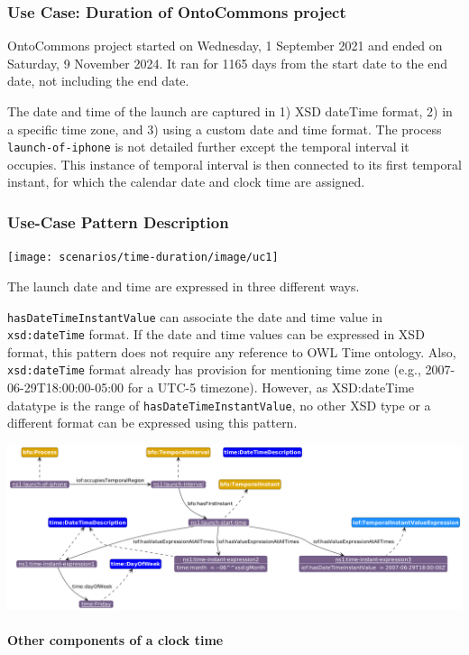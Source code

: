 \subsubsection*{Use Case: Duration of OntoCommons project} 
OntoCommons project started on Wednesday, 1 September 2021 and ended on Saturday, 9 November 2024. It ran for 1165 days from the start date to the end date, not including the end date.

The date and time of the launch are captured in 1) XSD dateTime format, 2) in a specific time zone, and 3) using a custom date and time format. The process \texttt{launch-of-iphone} is not detailed further except the temporal interval it occupies. This instance of temporal interval is then connected to its first temporal instant, for which the calendar date and clock time are assigned.   

\subsubsection*{Use-Case Pattern Description}

\texttt{[image: scenarios/time-duration/image/uc1]}

The launch date and time are expressed in three different ways.  

\texttt{hasDateTimeInstantValue} can associate the date and time value in \texttt{xsd:dateTime} format. If the date and time values can be expressed in XSD format, this pattern does not require any reference to OWL Time ontology. Also, \texttt{xsd:dateTime} format already has provision for mentioning time zone (e.g., 2007-06-29T18:00:00-05:00 for a UTC-5 timezone). However, as XSD:dateTime datatype is the range of \texttt{hasDateTimeInstantValue}, no other XSD type or a different format can be expressed using this pattern. 

\includegraphics[scale=0.35]{scenarios/clock-time-calendar-date/images/uc1-dow-mn.png}

\paragraph{Other components of a clock time \\}

